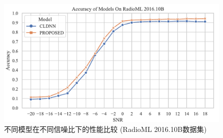 \begin{figure}
    \centering
    \includegraphics[width=\textwidth]{Image/16b_acc.pdf}
    \caption{不同模型在不同信噪比下的性能比较 (RadioML 2016.10B数据集)}
    \label{fig:2016B_res}
\end{figure}

